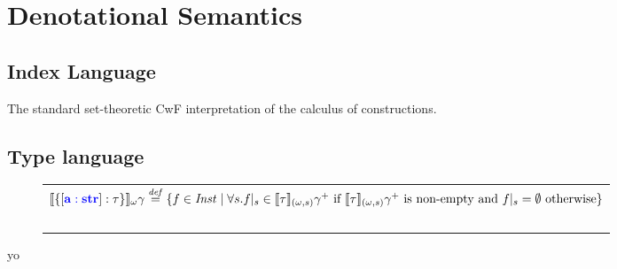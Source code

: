 \documentclass[sigplan,10pt,review,anonymous]{acmart}
\newcommand{\blum}[1]{\mathbf{\color{blue}{#1}}}
\newcommand{\defeq}{\overset{\mathit{def}}{=}}
\newcommand{\sem}[1]{\llbracket #1 \rrbracket}
\begin{document}
\section{Denotational Semantics}

\subsection{Index Language}

The standard set-theoretic CwF interpretation of the calculus of constructions.

\subsection{Type language}


\begin{figure*}
\begin{tabular}{l}
$\sem{\{ [\blum{a : str}] : \tau \}}_\omega \gamma \defeq \{ f \in \mathit{Inst} \mid \forall s. f |_s \in \sem{\tau}_{(\omega,s)} \gamma^+ \text{ if } \sem{\tau}_{(\omega,s)} \gamma^+ \text{ is non-empty } \text{and } f |_s = \emptyset \text{ otherwise} \}$ \\~\\

\end{tabular}
\end{figure*}

\pagebreak

yo




\end{document}
